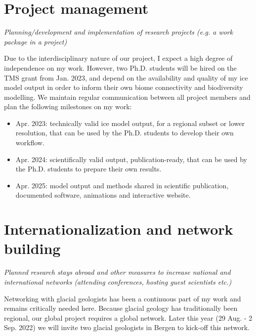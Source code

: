 \documentclass{article}
\newcommand{\guideline}[1]{{\color{color2}\itshape{#1}}}
\begin{document}
\section{Project management}

\guideline{
    Planning/development and implementation of research projects (e.g. a work
    package in a project)}

    Due to the interdisciplinary nature of our project, I expect a high degree
    of independence on my work. However, two Ph.D. students will be hired on
    the TMS grant from Jan. 2023, and depend on the availability and quality
    of my ice model output in order to inform their own biome connectivity and
    biodiversity modelling. We maintain regular communication between all
    project members and plan the following milestones on my work:

    \begin{itemize}
      \item Apr. 2023: technically valid ice model output, for a regional
        subset or lower resolution, that can be used by the Ph.D. students to
        develop their own workflow.
      \item Apr. 2024: scientifically valid output, publication-ready, that can
        be used by the Ph.D. students to prepare their own results.
      \item Apr. 2025: model output and methods shared in scientific
        publication, documented software, animations and interactive website.
    \end{itemize}


\section{Internationalization and network building}

\guideline{
    Planned research stays abroad and other measures to increase national and
    international networks (attending conferences, hosting guest scientists
    etc.)}

    Networking with glacial geologists has been a continuous part of my work
    and remains critically needed here. Because glacial geology has
    traditionally been regional, our global project requires a global network.
    Later this year (29 Aug. - 2 Sep. 2022) we will invite two glacial
    geologists in Bergen to kick-off this network.
\end{document}
